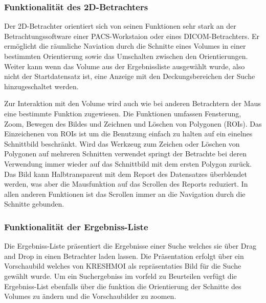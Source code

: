 \subsubsection{Funktionalität des 2D-Betrachters}
\label{sec:Funktionalität des 2D-Betrachters}
Der 2D-Betrachter orientiert sich von seinen Funktionen sehr stark an der Betrachtungssoftware einer PACS-Workstaion oder eines DICOM-Betrachters.
Er ermöglicht die räumliche Naviation durch die Schnitte eines Volumes in einer bestimmten Orientierung sowie das Umschalten zwischen den Orientierungen.
Weiter kann wenn das Volume aus der Ergebnissliste ausgewählt wurde, 
also nicht der Startdatensatz ist,
eine Anzeige mit den Deckungsbereichen der Suche hinzugeschaltet werden. 

Zur Interaktion mit den Volume wird auch wie bei anderen Betrachtern der Maus eine bestimmte Funktion zugewiesen.
Die Funktionen umfassen Fensterung, Zoom, Bewegen des Bildes und Zeichnen und Löschen von Polygonen (ROIs).
Das Einzeichenen von ROIs ist um die Benutzung einfach zu halten auf ein einelnes Schnittbild beschränkt.
Wird das Werkzeug zum Zeichen oder Löschen von Polygonen auf mehreren Schnitten verwendet springt der Betrachte bei deren Verwendung immer wieder auf das Schnittbild mit dem ersten Polygon zurück.
Das Bild kann Halbtransparent mit dem Report des Datensatzes überblendet werden, was aber die Mausfunktion auf das Scrollen des Reports reduziert.
In allen anderen Funktionen ist das Scrollen immer an die Navigation durch die Schnitte gebunden.

\subsubsection{Funktionalität der Ergebniss-Liste}
\label{sec:Funktionalität der Ergebniss-Liste}
Die Ergebniss-Liste präsentiert die Ergebnisse einer Suche welches sie über Drag and Drop in einen Betrachter laden lassen.
Die Präsentation erfolgt über ein Vorschaubild welches von KRESHMOI als repräsentaties Bild für die Suche gewählt wurde.
Um ein Suchergebniss im vorfeld zu Beurteilen verfügt die Ergebniss-List ebenfalls über die funktion die Orientierung der Schnitte des Volumes zu ändern und die Vorschaubilder zu zoomen.



